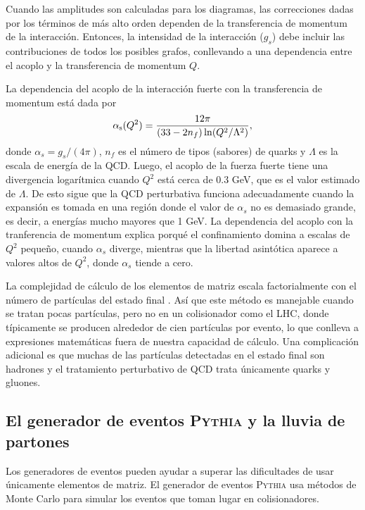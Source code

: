 \documentclass[a4paper,12pt]{article}
\begin{document}
Cuando las amplitudes son calculadas para los diagramas, las correcciones dadas por los términos de más alto orden dependen de la transferencia de momentum de la interacción. Entonces, la intensidad de la interacción ($g_s$) debe incluir las contribuciones de todos los posibles grafos, conllevando a una dependencia entre el acoplo y la transferencia de momentum $Q$.

La dependencia del acoplo de la interacción fuerte con la transferencia de momentum está dada por
\begin{equation}
\alpha_{\mathrm{s}}(Q^2) = \frac{12 \pi}{(33-2n_f)\ln(Q^2/\Lambda^2)},
\label{eq:alphastrong}
\end{equation}
donde $\alpha_s=g_s/(4\pi)$, $n_f$ es el número de tipos (sabores) de quarks y $\Lambda$ es la escala de energía de la QCD. Luego, el acoplo de la fuerza fuerte tiene una divergencia logarítmica cuando $Q^2$ está cerca de $0.3$ GeV, que es el valor estimado de $\Lambda$. De esto sigue que la QCD perturbativa funciona adecuadamente cuando la expansión es tomada en una región donde el valor de $\alpha_s$ no es demasiado grande, es decir, a energías mucho mayores que 1 GeV. La dependencia del acoplo con la tranferencia de momentum explica porqué el confinamiento domina a escalas de $Q^2$ pequeño, cuando $\alpha_s$ diverge, mientras que la libertad asintótica aparece a valores altos de $Q^2$, donde $\alpha_s$ tiende a cero.

La complejidad de cálculo de los elementos de matriz escala factorialmente con el número de partículas del estado final \cite{Peskin:1995}. Así que este método es manejable cuando se tratan pocas partículas, pero no en un colisionador como el LHC, donde típicamente se producen alrededor de cien partículas por evento, lo que conlleva a expresiones matemáticas fuera de nuestra capacidad de cálculo. Una complicación adicional es que muchas de las partículas detectadas en el estado final son hadrones y el tratamiento perturbativo de QCD trata únicamente quarks y gluones.

\subsection{El generador de eventos \textsc{Pythia} y la lluvia de partones}

Los generadores de eventos pueden ayudar a superar las dificultades de usar únicamente elementos de matriz. El generador de eventos \textsc{Pythia} usa métodos de Monte Carlo para simular los eventos que toman lugar en colisionadores.
\end{document}
